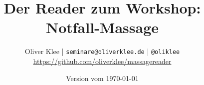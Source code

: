 \documentclass[a4paper,twoside,12pt,titlepage,headsepline]{scrartcl}
\author{Oliver Klee | \texttt{seminare@oliverklee.de} | \texttt{@oliklee}\\\url{https://github.com/oliverklee/massagereader}}
\title{Der Reader zum Workshop: Notfall-Massage}
\date{Version vom \today}
\begin{document}
\nocite*{}

\maketitle




\end{document}
